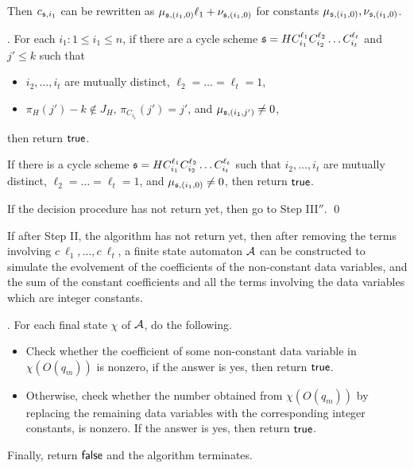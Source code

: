 \begin{appendix}
Then $c_{{\mathfrak{s} },i_1}$ can be rewritten as $\mu_{{\mathfrak{s} }, (i_1,0)} \ell_1 + \nu_{{\mathfrak{s} }, (i_1,0)}$ for constants $\mu_{{\mathfrak{s} }, (i_1,0)},\nu_{{\mathfrak{s} }, (i_1,0)}$.

\medskip

. For each $i_1: 1 \le i_1 \le n$, if there are a cycle scheme ${\mathfrak{s} }=HC_{i_1}^{\ell_1} C_{i_2}^{\ell_2} \dots C_{i_t}^{\ell_t}$  and $j' \le k$ such that 
\begin{itemize}
\item $i_2,\dots,i_t$ are mutually distinct, $\ell_2 = \dots = \ell_t = 1$, 
%
\item $\pi_H(j')-k \not \in J_H$, $\pi_{C_{i_1}}(j')=j'$, and $\mu_{{\mathfrak{s} },(i_1,j')} \neq 0$, 
\end{itemize}
then return $\mathsf{true}$.

If there is a cycle scheme ${\mathfrak{s} }=HC_{i_1}^{\ell_1} C_{i_2}^{\ell_2} \dots C_{i_t}^{\ell_t}$ such that 
$i_2,\dots,i_t$ are mutually distinct, $\ell_2 = \dots = \ell_t = 1$, 
%
and $\mu_{{\mathfrak{s} },(i_1,0)} \neq 0$, 
%
then return $\mathsf{true}$. 

If the decision procedure has not return yet, then go to Step III$''$. \qed

\medskip

If after Step II, the algorithm has not return yet, then after removing the terms involving $c\ \ell_1,\dots, c\ \ell_t$, a finite state automaton ${\mathcal{A} }$ can be constructed to simulate the evolvement of the coefficients of the non-constant data variables, and the sum of the constant coefficients and all the terms involving the data variables which are integer constants. 

\medskip



. For each final state $\chi$ of ${\mathcal{A} }$, do the following.
\begin{itemize}
\item Check whether the coefficient of some non-constant data variable in $\chi(O(q_m))$ is nonzero, if the answer is yes, then return $\mathsf{true}$.
%
\item Otherwise, check whether the number obtained from $\chi(O(q_m))$ by replacing the remaining data variables with the corresponding integer constants, is nonzero. If the answer is yes, then return $\mathsf{true}$. 
\end{itemize}
Finally, return $\mathsf{false}$ and the algorithm terminates.

\end{appendix}




